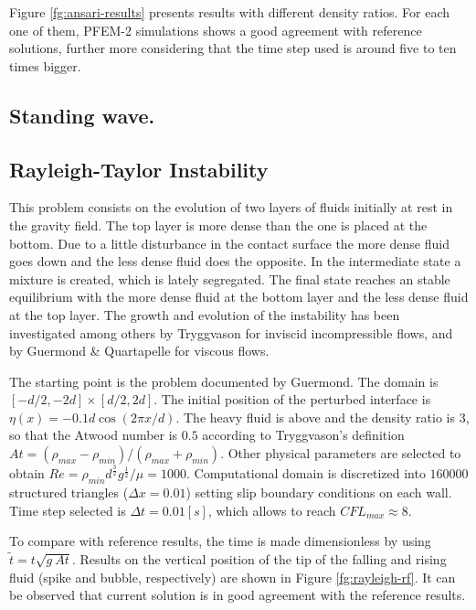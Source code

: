 \documentclass[a4paper,conference]{IEEEtran}
\begin{document}
Figure \ref{fg:ansari-results} presents results with different density ratios. For each one of them, PFEM-2 simulations shows a good agreement with reference solutions, further more considering that the time step used is around five to ten times bigger.

\subsection{Standing wave.}%

\subsection{Rayleigh-Taylor Instability}

This problem consists on the evolution of two layers of fluids initially at rest in the gravity field. The top layer is more dense than the one is placed at the bottom. Due to a little disturbance in the contact surface the more dense fluid goes down and the less dense fluid does the opposite. In the intermediate state a mixture is created, which is lately segregated. The final state reaches an stable equilibrium with the more dense fluid at the bottom layer and the less dense fluid at the top layer. The growth and evolution of the instability has been investigated among others by Tryggvason\cite{Tryggvason88} for inviscid incompressible flows, and by Guermond
\& Quartapelle\cite{Guermond00} for viscous flows.

The starting point is the problem documented by Guermond. The domain is $[−d/2,-2d]\times[d/2,2d]$. The initial position of the perturbed interface is $\eta(x) = −0.1d \cos(2\pi x/d)$. The heavy fluid is above and the density ratio is $3$, so that the Atwood
number is $0.5$ according to Tryggvason's definition $At = (\rho_{max}-\rho_{min})/(\rho_{max}+\rho_{min})$. Other physical parameters are selected to obtain $Re=\rho_{min}d^{\frac{3}{2}}g^{\frac{1}{2}}/\mu=1000$. Computational domain is discretized into $160000$ structured triangles ($\Delta x=0.01$) setting slip boundary conditions on each wall. Time step selected is $\Delta t=0.01[s]$, which allows to reach $CFL_{max} \approx 8$.

To compare with reference results, the time is made dimensionless by using $\widetilde{t} = t\sqrt{g\ At}$. Results on the vertical position of the tip of the falling and rising fluid (spike and bubble, respectively) are shown in Figure \ref{fg:rayleigh-rf}. It can be observed that current solution is in good agreement with the reference results.
\end{document}
